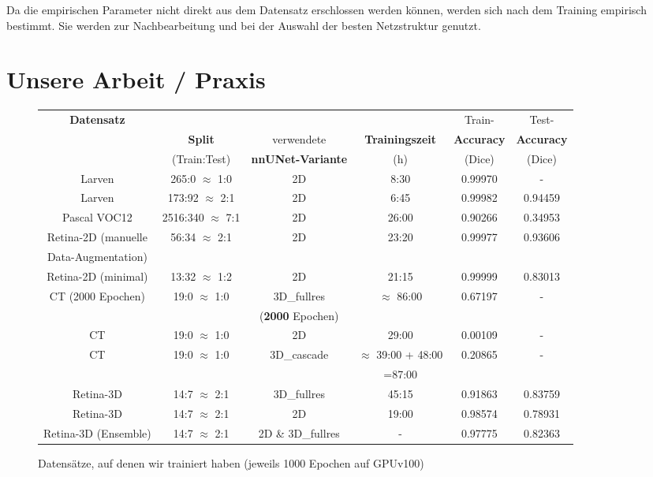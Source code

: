 Da die empirischen Parameter nicht direkt aus dem Datensatz erschlossen werden können, werden sich nach dem Training empirisch bestimmt. Sie werden zur Nachbearbeitung und bei der Auswahl der besten Netzstruktur genutzt. 


\section{Unsere Arbeit / Praxis}
\begin{figure}[H]
\begin{tabular}{|c|c|c|c|c|c|}
\hline 
\multirow{3}{*}{\textbf{Datensatz}} &  &  & & Train-& Test- \\ 
 & \textbf{Split} & verwendete & \textbf{Trainingszeit} & \textbf{Accuracy}& \textbf{Accuracy} \\ 
 & (Train:Test) & \textbf{nnUNet-Variante} & (h) & (Dice)& (Dice)  \\ 
\hline 
\hline
Larven & 265:0 $\approx$ 1:0 & 2D & 8:30 & 0.99970 & - \\ 
\hline 
Larven & 173:92 $\approx$ 2:1 & 2D & 6:45 & 0.99982 & 0.94459 \\ 
\hline 
Pascal VOC12 & 2516:340 $\approx$ 7:1 & 2D & 26:00 & 0.90266 & 0.34953 \\ 
\hline 
Retina-2D (manuelle & \multirow{2}{*}{56:34 $\approx$ 2:1} & \multirow{2}{*}{2D} & \multirow{2}{*}{23:20} & \multirow{2}{*}{0.99977} &\multirow{2}{*}{0.93606}  \\ 
Data-Augmentation)&  & & & &  \\ 
\hline 
Retina-2D (minimal) & 13:32 $\approx$ 1:2 & 2D & 21:15 & 0.99999 &  0.83013 \\ 
\hline 
\multirow{2}{*}{CT (2000 Epochen)} & \multirow{2}{*}{19:0 $\approx$ 1:0} & 3D\_fullres & \multirow{2}{*}{$\approx$ 86:00}  & \multirow{2}{*}{0.67197} & \multirow{2}{*}{-} \\ 
 &  & (\textbf{2000} Epochen) & &  &  \\ 
\hline 
CT & 19:0 $\approx$ 1:0 & 2D & 29:00 & 0.00109 & - \\ 
\hline 
\multirow{2}{*}{CT} & \multirow{2}{*}{19:0 $\approx$ 1:0} & \multirow{2}{*}{3D\_cascade} & $\approx$ 39:00 + 48:00 & \multirow{2}{*}{0.20865} & \multirow{2}{*}{-} \\ 
 &  &  & =87:00 &  & \\ 
\hline 
Retina-3D & 14:7 $\approx$ 2:1 & 3D\_fullres & 45:15 & 0.91863 & 0.83759 \\ 
\hline 
Retina-3D & 14:7 $\approx$ 2:1  & 2D & 19:00 & 0.98574 & 0.78931 \\ 
\hline 
Retina-3D (Ensemble) & 14:7 $\approx$ 2:1 & 2D \& 3D\_fullres & - & 0.97775 & 0.82363 \\ 
\hline
\end{tabular} 
\caption{Datensätze, auf denen wir trainiert haben (jeweils 1000 Epochen auf GPUv100)}
\label{tab:Training}
\end{figure}

